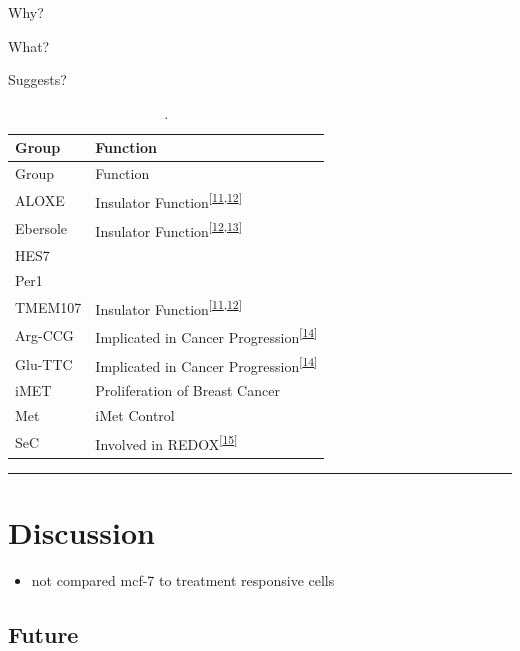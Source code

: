 \documentclass[
  12pt,
]{article}
\providecommand{\tightlist}{%
  \setlength{\itemsep}{0pt}\setlength{\parskip}{0pt}}
\begin{document}
Why?

What?

Suggests?

\begin{longtable}[]{@{}ll@{}}
\caption{\label{tab:clusters}.}\tabularnewline
\toprule()
Group & Function \\
\midrule()
\endfirsthead
\toprule()
Group & Function \\
\midrule()
\endhead
ALOXE & Insulator Function\textsuperscript{{[}\protect\hyperlink{ref-raab2011}{11},\protect\hyperlink{ref-sizer2022}{12}{]}} \\
Ebersole & Insulator Function\textsuperscript{{[}\protect\hyperlink{ref-sizer2022}{12},\protect\hyperlink{ref-Ebersole2011}{13}{]}} \\
HES7 & \\
Per1 & \\
TMEM107 & Insulator Function\textsuperscript{{[}\protect\hyperlink{ref-raab2011}{11},\protect\hyperlink{ref-sizer2022}{12}{]}} \\
Arg-CCG & Implicated in Cancer Progression\textsuperscript{{[}\protect\hyperlink{ref-Goodarzi2016}{14}{]}} \\
Glu-TTC & Implicated in Cancer Progression\textsuperscript{{[}\protect\hyperlink{ref-Goodarzi2016}{14}{]}} \\
iMET & Proliferation of Breast Cancer \\
Met & iMet Control \\
SeC & Involved in REDOX\textsuperscript{{[}\protect\hyperlink{ref-Sangha2022}{15}{]}} \\
\bottomrule()
\end{longtable}

\begin{center}\rule{0.5\linewidth}{0.5pt}\end{center}

\hypertarget{discussion}{%
\section{Discussion}\label{discussion}}

\begin{itemize}
\tightlist
\item
  not compared mcf-7 to treatment responsive cells
\end{itemize}

\hypertarget{future}{%
\subsection{Future}\label{future}}
\end{document}
